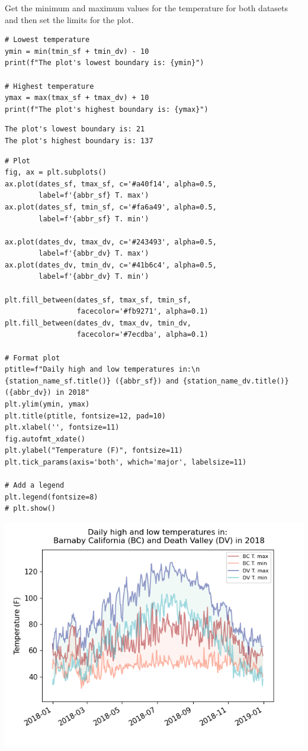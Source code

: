 \documentclass[10pt]{book}
\begin{document}
\begin{enumerate}
Get the minimum and maximum values for the temperature for both datasets and then set the limits for the plot.

\begin{verbatim}
# Lowest temperature
ymin = min(tmin_sf + tmin_dv) - 10
print(f"The plot's lowest boundary is: {ymin}")

# Highest temperature
ymax = max(tmax_sf + tmax_dv) + 10
print(f"The plot's highest boundary is: {ymax}")
\end{verbatim}

\label{org174d277}
\begin{verbatim}
The plot's lowest boundary is: 21
The plot's highest boundary is: 137
\end{verbatim}

\begin{verbatim}
# Plot
fig, ax = plt.subplots()
ax.plot(dates_sf, tmax_sf, c='#a40f14', alpha=0.5,
        label=f'{abbr_sf} T. max')
ax.plot(dates_sf, tmin_sf, c='#fa6a49', alpha=0.5,
        label=f'{abbr_sf} T. min')

ax.plot(dates_dv, tmax_dv, c='#243493', alpha=0.5,
        label=f'{abbr_dv} T. max')
ax.plot(dates_dv, tmin_dv, c='#41b6c4', alpha=0.5,
        label=f'{abbr_dv} T. min')

plt.fill_between(dates_sf, tmax_sf, tmin_sf,
                 facecolor='#fb9271', alpha=0.1)
plt.fill_between(dates_dv, tmax_dv, tmin_dv,
                 facecolor='#7ecdba', alpha=0.1)

# Format plot
ptitle=f"Daily high and low temperatures in:\n {station_name_sf.title()} ({abbr_sf}) and {station_name_dv.title()} ({abbr_dv}) in 2018"
plt.ylim(ymin, ymax)
plt.title(ptitle, fontsize=12, pad=10)
plt.xlabel('', fontsize=11)
fig.autofmt_xdate()
plt.ylabel("Temperature (F)", fontsize=11)
plt.tick_params(axis='both', which='major', labelsize=11)

# Add a legend
plt.legend(fontsize=8)
# plt.show()
\end{verbatim}

\begin{center}
\includegraphics[width=.9\linewidth]{output/images/Temp_range_SF_DV_2.png}
\label{org5daebb1}
\end{center}
\end{enumerate}
\printbibliography[heading=bibintoc]
\end{document}
